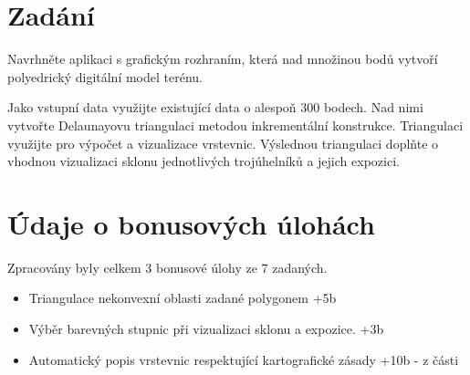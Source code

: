 \documentclass[11pt]{article}
\begin{document}



\tableofcontents

\clearpage


\section{Zadání}
Navrhněte aplikaci s grafickým rozhraním, která nad množinou bodů vytvoří polyedrický digitální model terénu.

Jako vstupní data využijte existující data o alespoň 300 bodech. Nad nimi vytvořte Delaunayovu triangulaci metodou inkrementální konstrukce. Triangulaci využijte pro výpočet a vizualizace vrstevnic. Výslednou triangulaci doplňte o vhodnou vizualizaci sklonu jednotlivých trojúhelníků a jejich expozici. 


\section{Údaje o bonusových úlohách}
Zpracovány byly celkem 3 bonusové úlohy ze 7 zadaných.

\begin{itemize}
	\item Triangulace nekonvexní oblasti zadané polygonem +5b
	\item Výběr barevných stupnic při vizualizaci sklonu a expozice. +3b
	\item Automatický popis vrstevnic respektující kartografické zásady +10b - z části
	
\end{itemize}

\end{document}
